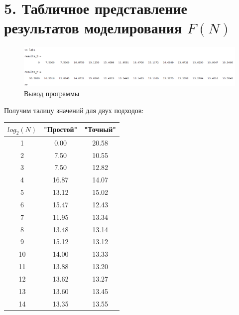 \documentclass[12pt]{article}
\begin{document}
 \section*{5. Табличное представление результатов моделирования $F(N)$}
 
\begin{figure}[!h]
	\centering
	\includegraphics[width=\linewidth]{output.png}
	\caption{Вывод программы}
\end{figure}

\begin{flushleft}

	Получим талицу значений для двух подходов:\\
	\begin{tabular}[c]{c|cc}
		$log_2(N)$ & "Простой" & "Точный" \\
		\hline
		1 & 0.00 & 20.58 \\
		2 & 7.50 & 10.55 \\
		3 & 7.50 & 12.82 \\
		4 & 16.87 & 14.07 \\
		5 & 13.12 & 15.02 \\
		6 & 15.47 & 12.43 \\
		7 & 11.95 & 13.34 \\
		8 & 13.48 & 13.14 \\
		9 & 15.12 & 13.12 \\
		10 & 14.00 & 13.33 \\
		11 & 13.88 & 13.20 \\
		12 & 13.62 & 13.27 \\
		13 & 13.60 & 13.45 \\
		14 & 13.35 & 13.55 \\
	\end{tabular}
	
		
\end{flushleft}
\end{document}
